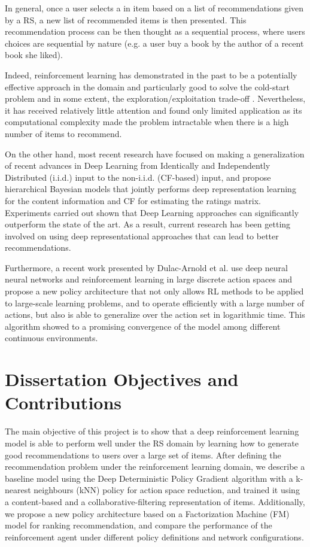 In general, once a user selects a in item based on a list of recommendations given by a RS, a new list of recommended items is then presented. This recommendation process can be then thought as a sequential process, where users choices are sequential by nature (e.g. a user buy a book by the author of a recent book she liked).

Indeed, reinforcement learning has demonstrated in the past to be a potentially effective approach in the domain and particularly good to solve the cold-start problem and in some extent, the exploration/exploitation trade-off \cite{shani2005mdp}. Nevertheless, it has received relatively little attention and found only limited application as its computational complexity made the problem intractable when there is a high number of items to recommend.

On the other hand, most recent research \cite{wang2015collaborative} have focused on making a generalization of recent advances in Deep Learning \cite{bengio2013representation} from Identically and Independently Distributed (i.i.d.) input to the non-i.i.d. (CF-based) input, and propose hierarchical Bayesian models that jointly performs deep representation learning for the content information and CF for estimating the ratings matrix. Experiments carried out shown that Deep Learning approaches can significantly outperform the state of the art. As a result, current research has been getting involved on using deep representational approaches that can lead to better recommendations.

Furthermore, a recent work presented by Dulac-Arnold et al. \cite{Dulac-Arnold2015} use deep neural neural networks and reinforcement learning in large discrete action spaces  and propose a new policy architecture that not only allows RL methods to be applied to large-scale learning problems, and to operate efficiently with a large number of actions, but also is able to generalize over the action set in logarithmic time. This algorithm showed to a promising convergence of the model among different continuous environments.

\section{Dissertation Objectives and Contributions}

The main objective of this project is to show that a deep reinforcement learning model is able to perform well under the RS domain by learning how to generate good recommendations to users over a large set of items. After defining the recommendation problem under the reinforcement learning domain, we describe a baseline model using the Deep Deterministic Policy Gradient algorithm with a k-nearest neighbours (kNN) policy for action space reduction, and trained it using a content-based and a collaborative-filtering representation of items. Additionally, we propose a new policy architecture based on a Factorization Machine (FM) model for ranking recommendation, and compare the performance of the reinforcement agent under different policy definitions and network configurations.

